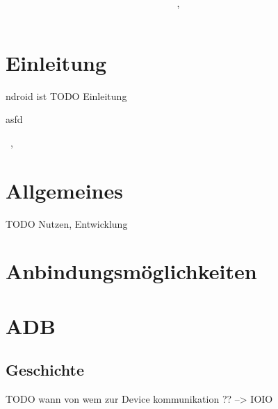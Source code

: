 \documentclass[12pt,journal,compsoc]{IEEEtran}
\begin{document}
\title{\paperTitle \\ \paperSubTitle }
\author{\paperAuthor,~}%



\maketitle

\section{Einleitung}


ndroid ist 
TODO Einleitung 

\cite{buch}asfd



\hfill{\the\day~\Monat, \the\year  }

\section{Allgemeines}
TODO Nutzen, Entwicklung

\section{Anbindungsmöglichkeiten}


\section{ADB}
\subsection{Geschichte}

TODO wann von wem zur Device kommunikation ?? --> IOIO
\end{document}
